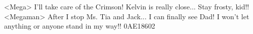 <Mega> I'll take care of the Crimson! 
Kelvin is really close... Stay frosty, kid!! 
<Megaman> After I stop Ms. Tia and Jack... I can finally see Dad! 
I won't let anything or anyone stand in my way!! 
{0A}{E1}{86}{02}

